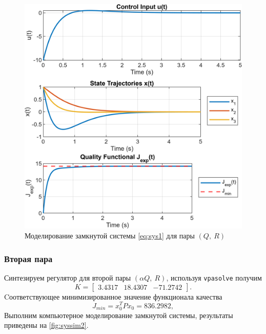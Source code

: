 \begin{figure}[H]
    \centering
    \includegraphics[width=0.9\linewidth]{figs/1_sim1.png}
    \caption{Моделирование замкнутой системы \eqref{eq:sys1} для пары $(Q,\ R)$}
    \label{fig:syssim1}
\end{figure}

\subsubsection{Вторая пара}

Синтезируем регулятор для второй пары $(\alpha Q,\ R)$, используя \texttt{vpasolve}
получим
\begin{equation*}
    K=\begin{bmatrix}
        3.4317  & 18.4307 & -71.2742
    \end{bmatrix}.
\end{equation*}
Cоответствующее минимизированное значение функционала качества
\begin{equation*}
    J_{min}=x_0^TPx_0=836.2982,
\end{equation*}
Выполним компьютерное моделирование замкнутой системы,
результаты приведены на \autoref{fig:syssim2}.

